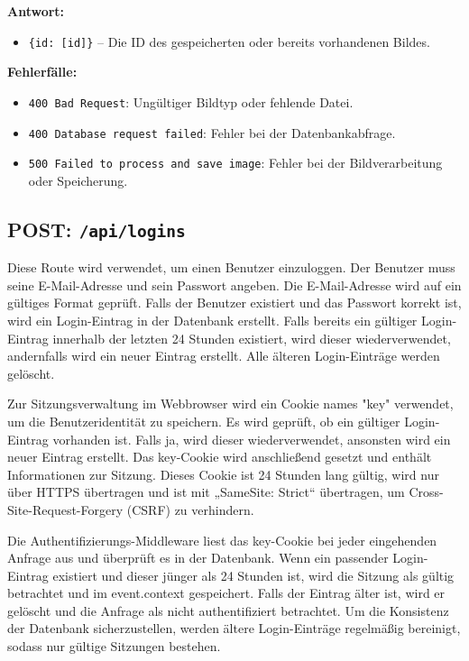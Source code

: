 \documentclass[a4paper,12pt]{article}
\begin{document}
\textbf{Antwort:}
\begin{itemize}
    \item \texttt{\{id: [id]\}} –
        Die ID des gespeicherten oder bereits vorhandenen Bildes.
\end{itemize}

\textbf{Fehlerfälle:}
\begin{itemize}
    \item \texttt{400 Bad Request}:
        Ungültiger Bildtyp oder fehlende Datei.
    \item \texttt{400 Database request failed}:
        Fehler bei der Datenbankabfrage.
    \item \texttt{500 Failed to process and save image}:
        Fehler bei der Bildverarbeitung oder Speicherung.
\end{itemize}

\newpage
\subsection{POST: \texttt{/api/logins}}

Diese Route wird verwendet, um einen Benutzer einzuloggen. Der Benutzer muss
seine E-Mail-Adresse und sein Passwort angeben. Die E-Mail-Adresse wird auf ein
gültiges Format geprüft. Falls der Benutzer existiert und das Passwort korrekt
ist, wird ein Login-Eintrag in der Datenbank erstellt. Falls bereits ein
gültiger Login-Eintrag innerhalb der letzten 24 Stunden existiert, wird dieser
wiederverwendet, andernfalls wird ein neuer Eintrag erstellt. Alle älteren
Login-Einträge werden gelöscht.

Zur Sitzungsverwaltung im Webbrowser wird ein Cookie names "key" verwendet, um
die Benutzeridentität zu speichern. Es wird geprüft, ob ein gültiger
Login-Eintrag vorhanden ist. Falls ja, wird dieser wiederverwendet, ansonsten
wird ein neuer Eintrag erstellt. Das key-Cookie wird anschließend gesetzt und
enthält Informationen zur Sitzung.  Dieses Cookie ist 24 Stunden lang gültig,
wird nur über HTTPS übertragen und ist mit „SameSite: Strict“ übertragen, um
Cross-Site-Request-Forgery (CSRF) zu verhindern.

Die Authentifizierungs-Middleware liest das key-Cookie bei jeder eingehenden
Anfrage aus und überprüft es in der Datenbank. Wenn ein passender Login-Eintrag
existiert und dieser jünger als 24 Stunden ist, wird die Sitzung als gültig
betrachtet und im event.context gespeichert. Falls der Eintrag älter ist, wird
er gelöscht und die Anfrage als nicht authentifiziert betrachtet. Um die
Konsistenz der Datenbank sicherzustellen, werden ältere Login-Einträge
regelmäßig bereinigt, sodass nur gültige Sitzungen bestehen.
\end{document}
